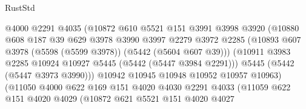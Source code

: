 \begin{lexlean}{RustStd}
\begin{coremodule}
{\begin{coremodule}
{{{{{{{{{{{{                                @4000
                                @2291
                                @4035
                                (@10872
                                  @610
                                  @5521
                                  @151
                                  @3991
                                  @3998
                                  @3920
                                  (@10880
                                    @608
                                    @187
                                    @39
                                    @629
                                    @3978
                                    @3990
                                    @3997
                                    @2279
                                    @3972
                                    @2285
                                    (@10893
                                      @607
                                      @3978
                                      (@5598 (@5599 @3978))
                                      (@5442 (@5604 @607 @39)))
                                    (@10911
                                      @3983
                                      @2285
                                      @10924
                                      @10927
                                      @5445
                                      (@5442 (@5447 @3984 @2291)))
                                    @5445
                                    (@5442 (@5447 @3973 @3990)))
                                  @10942
                                  @10945
                                  @10948
                                  @10952
                                  @10957
                                  @10963)
                                (@11050
                                  @4000
                                  @622
                                  @169
                                  @151
                                  @4020
                                  @4030
                                  @2291
                                  @4033
                                  (@11059
                                    @622
                                    @151
                                    @4020
                                    @4029
                                    (@10872
                                      @621
                                      @5521
                                      @151
                                      @4020
                                      @4027
}}}}}}}}}}}}
\end{coremodule}}
\end{coremodule}
\end{lexlean}
